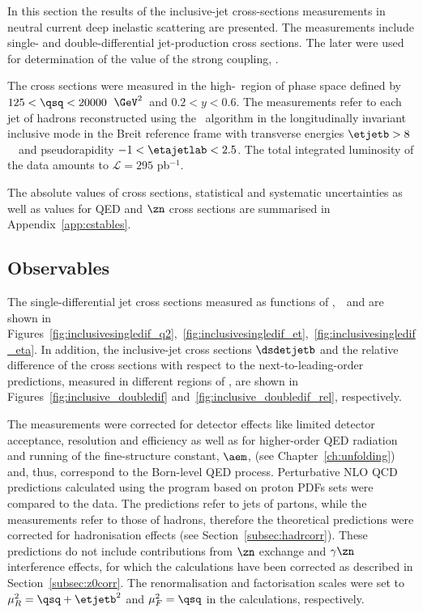 In this section the results of the inclusive-jet cross-sections measurements in neutral current deep inelastic scattering are presented. The measurements include single- and double-differential jet-production cross sections. The later were used for determination of the value of the strong coupling, \asz. 

The cross sections were measured in the high-\qsq~region of phase space defined by $125 < \qsq < 20000$~$\GeV^2$~and $0.2<y<0.6$. The measurements refer to each jet of hadrons reconstructed using the \kt\, algorithm in the longitudinally invariant inclusive mode in the Breit reference frame with transverse energies $\etjetb > 8$~\GeV~and pseudorapidity $-1<\etajetlab<2.5$. The total integrated luminosity of the data amounts to $\mathcal{L}=295$ pb$^{-1}$.

The absolute values of cross sections, statistical and systematic uncertainties as well as values for QED and $\zn$ cross sections are summarised in Appendix~\ref{app:cstables}.

\subsection{Observables}
The single-differential jet cross sections measured as functions of \qsq,~\etjetb~and \etajetlab are shown in Figures~\ref{fig:inclusivesingledif_q2},~\ref{fig:inclusivesingledif_et},~\ref{fig:inclusivesingledif_eta}. In addition, the inclusive-jet cross sections $\dsdetjetb$ and the relative difference of the cross sections with respect to the next-to-leading-order predictions, measured in different regions of \qsq, are shown in Figures~\ref{fig:inclusive_doubledif} and~\ref{fig:inclusive_doubledif_rel}, respectively.

The measurements were corrected for detector effects like limited detector acceptance, resolution and efficiency as well as for higher-order QED radiation and running of the fine-structure constant, $\aem$, (see Chapter~\ref{ch:unfolding}) and, thus, correspond to the Born-level QED process. Perturbative NLO QCD predictions calculated using the \nlojet program based on  proton PDFs sets were compared to the data. The \nlojet predictions refer to jets of partons, while the measurements refer to those of hadrons, therefore the theoretical predictions were corrected for hadronisation effects (see Section~\ref{subsec:hadrcorr}). These predictions do not include contributions from $\zn$ exchange and $\gamma\zn$ interference effects, for which the calculations have been corrected as described in Section~\ref{subsec:z0corr}. The renormalisation and factorisation scales were set to $\mu_R^2 = \qsq + \etjetb^2$ and $\mu_F^2 = \qsq$ in the calculations, respectively.

